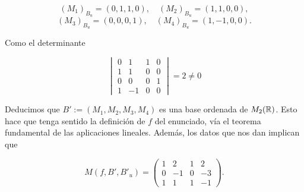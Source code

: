 \documentclass[12pt]{article}
\begin{document}
\begin{ejercicio}[2.5 puntos]
\begin{enumerate}
			$$(M_1)_{B_u} = (0,1,1,0), \quad (M_2)_{B_u} = (1,1,0,0), $$ 
			$$ (M_3)_{B_u} = (0,0,0,1), \quad (M_4)_{B_u} = (1,-1,0,0).$$
			
			Como el determinante 
			
			$$ \begin{vmatrix}
				0 & 1 & 1 & 0 \\
				1 & 1 & 0 & 0 \\
				0 & 0 & 0 & 1 \\
				1 & -1 & 0 & 0 
			\end{vmatrix} = 2 \ne 0 $$
			
			Deducimos que $B' := (M_1, M_2, M_3, M_4)$ es una base ordenada de $M_2({\mathbb{R}})$. Esto hace que tenga sentido la definición de $f$ del enunciado, vía el teorema fundamental de las aplicaciones lineales. Además, los datos que nos dan implican que
			
			$$ M(f, B', B'_u)= \begin{pmatrix}
				1 & 2 & 1 & 2 \\
				0 & -1 & 0 & -3 \\
				1 & 1 & 1 & -1
			\end{pmatrix}. $$
			

\end{enumerate}
\end{ejercicio}
\end{document}
